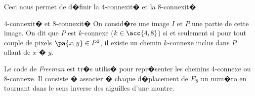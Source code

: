Ceci nous permet de d�finir la 4-connexit� et la 8-connexit�.

        \begin{xdefinition}{4-connexit� et 8-connexit�}
        On consid�re une image $I$ et $P$ une partie de cette image. On dit que $P$ 
        est $k$-connexe ($k \in \acc{4,8}$) si et seulement si pour tout couple de pixels 
        $\pa{x,y} \in P^2$, il existe un chemin $k$-connexe inclus dans $P$ allant de $x$ � $y$.
        \end{xdefinition}


Le code de \emph{Freeman} est tr�s utilis� pour repr�senter les chemins 4-connexe ou 8-connexe. Il consiste � associer � chaque d�placement de $E_8$ un num�ro en tournant dans le sens inverse des aiguilles d'une montre.

















